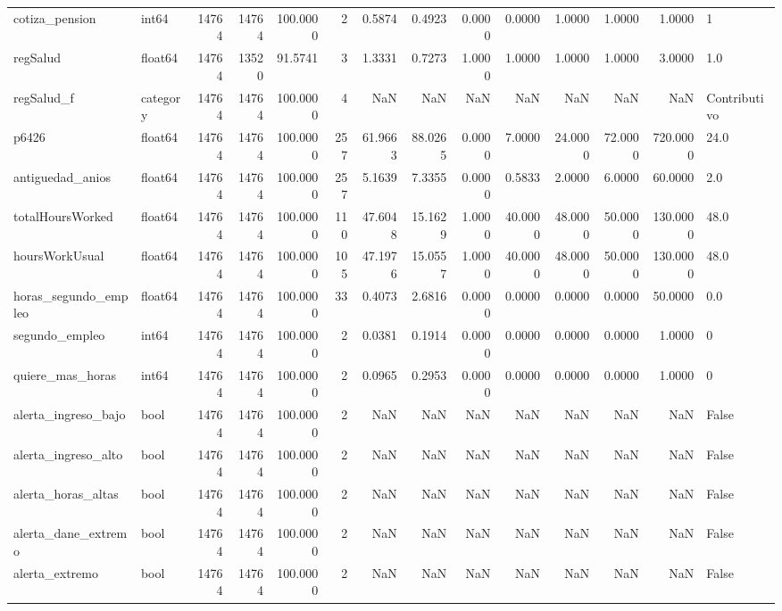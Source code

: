 \begin{longtable}{llrrrrrrrrrrrl}
cotiza\_pension & int64 & 14764 & 14764 & 100.0000 & 2 & 0.5874 & 0.4923 & 0.0000 & 0.0000 & 1.0000 & 1.0000 & 1.0000 & 1 \\
regSalud & float64 & 14764 & 13520 & 91.5741 & 3 & 1.3331 & 0.7273 & 1.0000 & 1.0000 & 1.0000 & 1.0000 & 3.0000 & 1.0 \\
regSalud\_f & category & 14764 & 14764 & 100.0000 & 4 & NaN & NaN & NaN & NaN & NaN & NaN & NaN & Contributivo \\
p6426 & float64 & 14764 & 14764 & 100.0000 & 257 & 61.9663 & 88.0265 & 0.0000 & 7.0000 & 24.0000 & 72.0000 & 720.0000 & 24.0 \\
antiguedad\_anios & float64 & 14764 & 14764 & 100.0000 & 257 & 5.1639 & 7.3355 & 0.0000 & 0.5833 & 2.0000 & 6.0000 & 60.0000 & 2.0 \\
totalHoursWorked & float64 & 14764 & 14764 & 100.0000 & 110 & 47.6048 & 15.1629 & 1.0000 & 40.0000 & 48.0000 & 50.0000 & 130.0000 & 48.0 \\
hoursWorkUsual & float64 & 14764 & 14764 & 100.0000 & 105 & 47.1976 & 15.0557 & 1.0000 & 40.0000 & 48.0000 & 50.0000 & 130.0000 & 48.0 \\
horas\_segundo\_empleo & float64 & 14764 & 14764 & 100.0000 & 33 & 0.4073 & 2.6816 & 0.0000 & 0.0000 & 0.0000 & 0.0000 & 50.0000 & 0.0 \\
segundo\_empleo & int64 & 14764 & 14764 & 100.0000 & 2 & 0.0381 & 0.1914 & 0.0000 & 0.0000 & 0.0000 & 0.0000 & 1.0000 & 0 \\
quiere\_mas\_horas & int64 & 14764 & 14764 & 100.0000 & 2 & 0.0965 & 0.2953 & 0.0000 & 0.0000 & 0.0000 & 0.0000 & 1.0000 & 0 \\
alerta\_ingreso\_bajo & bool & 14764 & 14764 & 100.0000 & 2 & NaN & NaN & NaN & NaN & NaN & NaN & NaN & False \\
alerta\_ingreso\_alto & bool & 14764 & 14764 & 100.0000 & 2 & NaN & NaN & NaN & NaN & NaN & NaN & NaN & False \\
alerta\_horas\_altas & bool & 14764 & 14764 & 100.0000 & 2 & NaN & NaN & NaN & NaN & NaN & NaN & NaN & False \\
alerta\_dane\_extremo & bool & 14764 & 14764 & 100.0000 & 2 & NaN & NaN & NaN & NaN & NaN & NaN & NaN & False \\
alerta\_extremo & bool & 14764 & 14764 & 100.0000 & 2 & NaN & NaN & NaN & NaN & NaN & NaN & NaN & False \\
\end{longtable}
